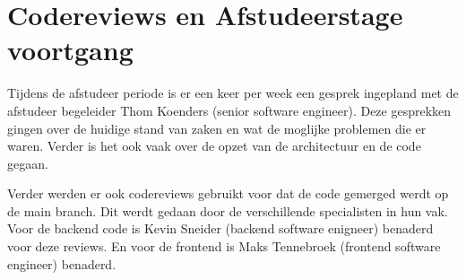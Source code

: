 \section{Codereviews en Afstudeerstage voortgang}
\label{section:CodereviewsEnStageVoortgang}
Tijdens de afstudeer periode is er een keer per week een gesprek ingepland met de afstudeer begeleider Thom Koenders (senior software engineer).
Deze gesprekken gingen over de huidige stand van zaken en wat de moglijke problemen die er waren.
Verder is het ook vaak over de opzet van de architectuur en de code gegaan.

\whitespace
Verder werden er ook codereviews gebruikt voor dat de code gemerged werdt op de main branch.
Dit werdt gedaan door de verschillende specialisten in hun vak.
Voor de backend code is Kevin Sneider (backend software enigneer) benaderd voor deze reviews.
En voor de frontend is Maks Tennebroek (frontend software engineer) benaderd.
